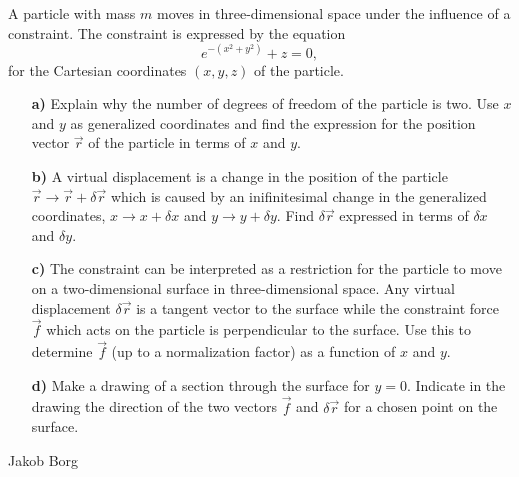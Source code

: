 \documentclass[11pt,a4paper]{report}
\newcounter{excount}[chapter]
\newenvironment{exercise}[1][]{\addtocounter{excount}{1} \noindent {\bf Problem
    \arabic{excount} \ \ #1}\hspace{2mm}}{\vspace{4mm}}
\newenvironment{solution}
    {\begin{tcolorbox}[title=Solution,halign lower=right,breakable]
    }
    {
    \tcblower Jakob Borg
    \end{tcolorbox}
	\vspace{5mm}
    }
\begin{document}
\begin{exercise}
A particle with mass $m$ moves in three-dimensional space under the influence of a constraint. The constraint is expressed by the equation
\begin{equation}
e^{-(x^2+y^2)}+z=0,
\end{equation}
for the Cartesian coordinates $(x,y,z)$ of the particle.
\begin{itemize}
\item[\bf a)]Explain why the number of degrees of freedom of the particle is two. Use $x$ and $y$ as generalized coordinates and find the expression for the position vector $\vec r$ of the particle in terms of $x$ and $y$. 
\item[\bf b)]A virtual displacement is a change in the position of the particle $\vec r \to \vec r + \delta \vec r$ which is caused by an inifinitesimal change in the generalized coordinates, $x \to x + \delta x$ and $y\to y+\delta y$. Find $\delta \vec r$ expressed in terms of $\delta x$ and $\delta y$.
\item[\bf c)]The constraint can be interpreted as a restriction for the particle to move on a two-dimensional surface in three-dimensional space. Any virtual displacement $\delta \vec r$ is a tangent vector to the surface while the constraint force $\vec f$ which acts on the particle is perpendicular to the surface. Use this to determine $\vec f $ (up to a normalization factor) as a function of $x$ and $y$.
\item[\bf d)]Make a drawing of a section through the surface for $y=0$. Indicate in the drawing the direction of the two vectors $\vec f$ and $\delta \vec r$ for a chosen point on the surface.
\end{itemize}

\begin{solution}


\end{solution}
\end{exercise}
\end{document}
